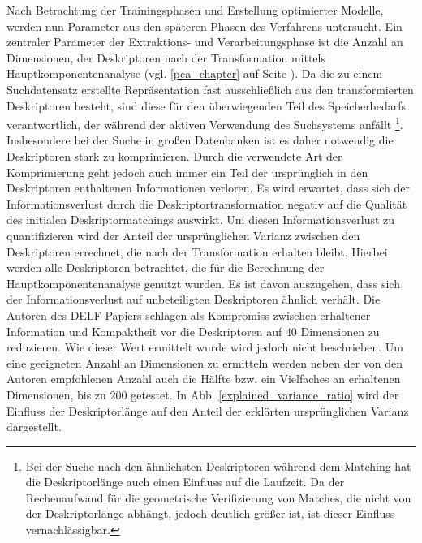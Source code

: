 Nach Betrachtung der Trainingsphasen und Erstellung optimierter Modelle, werden nun Parameter aus den späteren Phasen des Verfahrens untersucht.
Ein zentraler Parameter der Extraktions- und Verarbeitungsphase ist die Anzahl an Dimensionen, der Deskriptoren nach der Transformation mittels Hauptkomponentenanalyse (vgl. \ref{pca_chapter} auf Seite \pageref{pca_chapter}). Da die zu einem Suchdatensatz erstellte Repräsentation fast ausschließlich aus den transformierten Deskriptoren besteht, sind diese für den überwiegenden Teil des Speicherbedarfs verantwortlich, der während der aktiven Verwendung des Suchsystems anfällt \footnote{Bei der Suche nach den ähnlichsten Deskriptoren während dem Matching hat die Deskriptorlänge auch einen Einfluss auf die Laufzeit. Da der Rechenaufwand für die geometrische Verifizierung von Matches, die nicht von der Deskriptorlänge abhängt, jedoch deutlich größer ist, ist dieser Einfluss vernachlässigbar.}. Insbesondere bei der Suche in großen Datenbanken ist es daher notwendig die Deskriptoren stark zu komprimieren. Durch die verwendete Art der Komprimierung geht jedoch auch immer ein Teil der ursprünglich in den Deskriptoren enthaltenen Informationen verloren. Es wird erwartet, dass sich der Informationsverlust durch die Deskriptortransformation negativ auf die Qualität des initialen Deskriptormatchings auswirkt. Um diesen Informationsverlust zu quantifizieren wird der Anteil der ursprünglichen Varianz zwischen den Deskriptoren errechnet, die nach der Transformation erhalten bleibt. Hierbei werden alle Deskriptoren betrachtet, die für die Berechnung der Hauptkomponentenanalyse genutzt wurden. Es ist davon auszugehen, dass sich der Informationsverlust auf unbeteiligten Deskriptoren ähnlich verhält. Die Autoren des DELF-Papiers \cite{delf} schlagen als Kompromiss zwischen erhaltener Information und Kompaktheit vor die Deskriptoren auf $40$ Dimensionen zu reduzieren. Wie dieser Wert ermittelt wurde wird jedoch nicht beschrieben. Um eine geeigneten Anzahl an Dimensionen zu ermitteln werden neben der von den Autoren empfohlenen Anzahl auch die Hälfte bzw. ein Vielfaches an erhaltenen Dimensionen, bis zu $200$ getestet. In Abb. \ref{explained_variance_ratio} wird der Einfluss der Deskriptorlänge auf den Anteil der erklärten ursprünglichen Varianz dargestellt.
